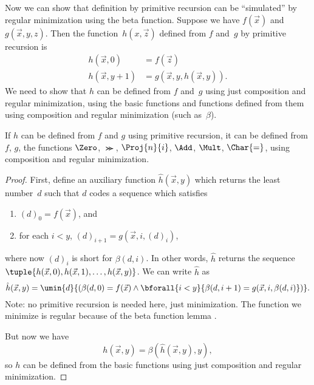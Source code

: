 \documentclass[../../../include/open-logic-section]{subfiles}
\begin{document}

Now we can show that definition by primitive recursion can be
``simulated'' by regular minimization using the beta function. Suppose
we have $f(\vec x)$ and $g(\vec x, y, z)$. Then the function~$h(x,\vec
z)$ defined from $f$ and~$g$ by primitive recursion is
\begin{align*}
h(\vec x, 0) & =  f(\vec z) \\
h(\vec x, y+1) & =  g(\vec x, y, h(\vec x, y)).
\end{align*}
We need to show that $h$ can be defined from $f$ and~$g$ using just
composition and regular minimization, using the basic functions and
functions defined from them using composition and regular minimization
(such as~$\beta$).

\begin{lem}
If $h$ can be defined from $f$ and $g$ using primitive recursion, it
can be defined from $f$, $g$, the functions $\Zero$, $\Succ$,
$\Proj{n}{i}$, $\Add$, $\Mult$, $\Char{=}$, using composition and
regular minimization.
\end{lem}

\begin{proof}
First, define an auxiliary function $\hat h(\vec x, y)$ which returns
the least number~$d$ such that $d$ codes a sequence which satisfies
\begin{enumerate}
\item $(d)_0 = f(\vec x)$, and
\item for each $i < y$, $(d)_{i+1} = g(\vec x, i, (d)_i)$,
\end{enumerate}
where now $(d)_i$ is short for $\beta(d,i)$. In other words, $\hat h$
returns the sequence $\tuple{h(\vec x, 0), h(\vec x, 1), \dots, h(\vec
x, y)}$. We can write $\hat h$ as
\[
\hat h(\vec x, y) = \umin{d}{(\beta(d,0) = f(\vec x) \land \bforall{i <
  y}{\beta(d,i+1) = g(\vec x, i,\beta(d,i)})}.
\]
Note: no primitive recursion is needed here, just minimization. The
function we minimize is regular because of the beta function lemma
.

But now we have
\[
h(\vec x, y) = \beta(\hat h(\vec x, y), y),
\]
so $h$ can be defined from the basic functions using just composition
and regular minimization.
\end{proof}
\end{document}
